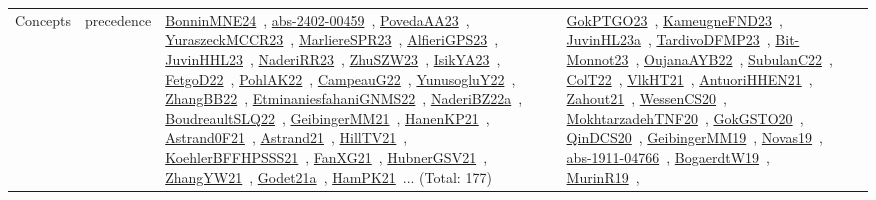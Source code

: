 {\begin{longtable}{lp{3cm}>{\raggedright\arraybackslash}p{6cm}>{\raggedright\arraybackslash}p{6cm}>{\raggedright\arraybackslash}p{8cm}}
Concepts & precedence & \href{../works/BonninMNE24.pdf}{BonninMNE24}~\cite{BonninMNE24}, \href{../works/abs-2402-00459.pdf}{abs-2402-00459}~\cite{abs-2402-00459}, \href{../works/PovedaAA23.pdf}{PovedaAA23}~\cite{PovedaAA23}, \href{../works/YuraszeckMCCR23.pdf}{YuraszeckMCCR23}~\cite{YuraszeckMCCR23}, \href{../works/MarliereSPR23.pdf}{MarliereSPR23}~\cite{MarliereSPR23}, \href{../works/AlfieriGPS23.pdf}{AlfieriGPS23}~\cite{AlfieriGPS23}, \href{../works/JuvinHHL23.pdf}{JuvinHHL23}~\cite{JuvinHHL23}, \href{../works/NaderiRR23.pdf}{NaderiRR23}~\cite{NaderiRR23}, \href{../works/ZhuSZW23.pdf}{ZhuSZW23}~\cite{ZhuSZW23}, \href{../works/IsikYA23.pdf}{IsikYA23}~\cite{IsikYA23}, \href{../works/FetgoD22.pdf}{FetgoD22}~\cite{FetgoD22}, \href{../works/PohlAK22.pdf}{PohlAK22}~\cite{PohlAK22}, \href{../works/CampeauG22.pdf}{CampeauG22}~\cite{CampeauG22}, \href{../works/YunusogluY22.pdf}{YunusogluY22}~\cite{YunusogluY22}, \href{../works/ZhangBB22.pdf}{ZhangBB22}~\cite{ZhangBB22}, \href{../works/EtminaniesfahaniGNMS22.pdf}{EtminaniesfahaniGNMS22}~\cite{EtminaniesfahaniGNMS22}, \href{../works/NaderiBZ22a.pdf}{NaderiBZ22a}~\cite{NaderiBZ22a}, \href{../works/BoudreaultSLQ22.pdf}{BoudreaultSLQ22}~\cite{BoudreaultSLQ22}, \href{../works/GeibingerMM21.pdf}{GeibingerMM21}~\cite{GeibingerMM21}, \href{../works/HanenKP21.pdf}{HanenKP21}~\cite{HanenKP21}, \href{../works/Astrand0F21.pdf}{Astrand0F21}~\cite{Astrand0F21}, \href{../works/Astrand21.pdf}{Astrand21}~\cite{Astrand21}, \href{../works/HillTV21.pdf}{HillTV21}~\cite{HillTV21}, \href{../works/KoehlerBFFHPSSS21.pdf}{KoehlerBFFHPSSS21}~\cite{KoehlerBFFHPSSS21}, \href{../works/FanXG21.pdf}{FanXG21}~\cite{FanXG21}, \href{../works/HubnerGSV21.pdf}{HubnerGSV21}~\cite{HubnerGSV21}, \href{../works/ZhangYW21.pdf}{ZhangYW21}~\cite{ZhangYW21}, \href{../works/Godet21a.pdf}{Godet21a}~\cite{Godet21a}, \href{../works/HamPK21.pdf}{HamPK21}~\cite{HamPK21}... (Total: 177) & \href{../works/GokPTGO23.pdf}{GokPTGO23}~\cite{GokPTGO23}, \href{../works/KameugneFND23.pdf}{KameugneFND23}~\cite{KameugneFND23}, \href{../works/JuvinHL23a.pdf}{JuvinHL23a}~\cite{JuvinHL23a}, \href{../works/TardivoDFMP23.pdf}{TardivoDFMP23}~\cite{TardivoDFMP23}, \href{../works/Bit-Monnot23.pdf}{Bit-Monnot23}~\cite{Bit-Monnot23}, \href{../works/OujanaAYB22.pdf}{OujanaAYB22}~\cite{OujanaAYB22}, \href{../works/SubulanC22.pdf}{SubulanC22}~\cite{SubulanC22}, \href{../works/ColT22.pdf}{ColT22}~\cite{ColT22}, \href{../works/VlkHT21.pdf}{VlkHT21}~\cite{VlkHT21}, \href{../works/AntuoriHHEN21.pdf}{AntuoriHHEN21}~\cite{AntuoriHHEN21}, \href{../works/Zahout21.pdf}{Zahout21}~\cite{Zahout21}, \href{../works/WessenCS20.pdf}{WessenCS20}~\cite{WessenCS20}, \href{../works/MokhtarzadehTNF20.pdf}{MokhtarzadehTNF20}~\cite{MokhtarzadehTNF20}, \href{../works/GokGSTO20.pdf}{GokGSTO20}~\cite{GokGSTO20}, \href{../works/QinDCS20.pdf}{QinDCS20}~\cite{QinDCS20}, \href{../works/GeibingerMM19.pdf}{GeibingerMM19}~\cite{GeibingerMM19}, \href{../works/Novas19.pdf}{Novas19}~\cite{Novas19}, \href{../works/abs-1911-04766.pdf}{abs-1911-04766}~\cite{abs-1911-04766}, \href{../works/BogaerdtW19.pdf}{BogaerdtW19}~\cite{BogaerdtW19}, \href{../works/MurinR19.pdf}{MurinR19}~\cite{MurinR19}, 
\end{longtable}}
